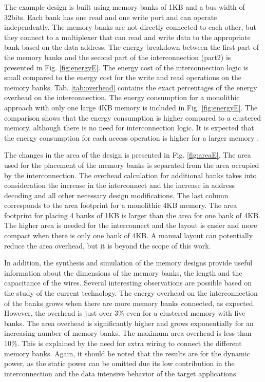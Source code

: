 The example design is built using memory banks of 1KB and a bus width of 32bits.
Each bank has one read and one write port and can operate independently.
The memory banks are not directly connected to each other, but they connect to a multiplexer that can read and write data to the appropriate bank based on the data address. 
The energy breakdown between the first part of the memory banks and the second part of the interconnection (part2) is presented in Fig. \ref{fig:energyE}.
The energy cost of the interconnection logic is small compared to the energy cost for the write and read operations on the memory banks.
Tab. \ref{tab:overhead} contains the exact percentages of the energy overhead on the interconnection. 
The energy consumption for a monolithic approach with only one large 4KB memory is included in Fig. \ref{fig:energyE}.
The comparison shows that the energy consumption is higher compared to a clustered memory, although there is no need for interconnection logic.
It is expected that the energy consumption for each access operation is higher for a larger memory \cite{steinke2002assigning}.
 
The changes in the area of the design is presented in Fig. \ref{fig:areaE}.
The area used for the placement of the memory banks is separated from the area occupied by the interconnection.
The overhead calculation for additional banks takes into consideration the increase in the interconnect and the increase in address decoding and all other necessary design modifications.
The last column corresponds to the area footprint for a monolithic 4KB memory.
The area footprint for placing 4 banks of 1KB is larger than the area for one bank of 4KB.
The higher area is needed for the interconnect and the layout is easier and more compact when there is only one bank of 4KB.
A manual layout can potentially reduce the area overhead, but it is beyond the scope of this work.

In addition, the synthesis and simulation of the memory designs provide useful information about the dimensions of the memory banks, the length and the capacitance of the wires.
Several interesting observations are possible based on the study of the current technology.
The energy overhead on the interconnection of the banks grows when there are more memory banks connected, as expected.
However, the overhead is just over 3\% even for a clustered memory with five banks. 
The area overhead is significantly higher and grows exponentially for an increasing number of memory banks.  
The maximum area overhead is less than 10\%.
This is explained by the need for extra wiring to connect the different memory banks.
Again, it should be noted that the results are for the dynamic power, as the static power can be omitted due its low contribution in the interconnection and the data intensive behavior of the target applications.

